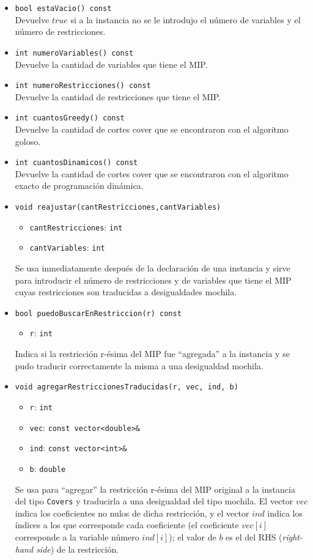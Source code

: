 \begin{itemize}
\item \verb_bool estaVacio() const_\\
Devuelve $true$ si a la instancia no se le introdujo el número de variables y el número de restricciones.

\item \verb_int numeroVariables() const_\\
Devuelve la cantidad de variables que tiene el MIP.

\item \verb_int numeroRestricciones() const_\\
Devuelve la cantidad de restricciones que tiene el MIP.

\item \verb_int cuantosGreedy() const_\\
Devuelve la cantidad de cortes cover que se encontraron con el algoritmo goloso.

\item \verb_int cuantosDinamicos() const_\\
Devuelve la cantidad de cortes cover que se encontraron con el algoritmo exacto de programación dinámica.

\item \verb_void reajustar(cantRestricciones,cantVariables)_
	\begin{itemize}
	\item \verb_cantRestricciones_: \verb_int_
	\item \verb_cantVariables_: \verb_int_
	\end{itemize}
Se usa inmediatamente después de la declaración de una instancia y sirve para introducir el número de restricciones y de variables que tiene el MIP cuyas restricciones son traducidas a desigualdades mochila.

\item \verb_bool puedoBuscarEnRestriccion(r) const_
	\begin{itemize}
	\item \verb_r_: \verb_int_
	\end{itemize}
Indica si la restricción r-ésima del MIP fue ``agregada'' a la instancia y se pudo traducir correctamente la misma a una desigualdad mochila.

\item \verb_void agregarRestriccionesTraducidas(r, vec, ind, b)_
	\begin{itemize}
	\item \verb_r_: \verb_int_
	\item \verb_vec_: \verb_const vector<double>&_
	\item \verb_ind_: \verb_const vector<int>&_
	\item \verb_b_: \verb_double_
	\end{itemize}
Se usa para ``agregar'' la restricción r-ésima del MIP original a la instancia del tipo \verb_Covers_ y traducirla a una desigualdad del tipo mochila. El vector $vec$ indica los coeficientes no nulos de dicha restricción, y el vector $ind$ indica los índices a los que corresponde cada coeficiente (el coeficiente $vec[i]$ corresponde a la variable número $ind[i]$); el valor de $b$ es el del RHS (\emph{right-hand side}) de la restricción.


\end{itemize}
